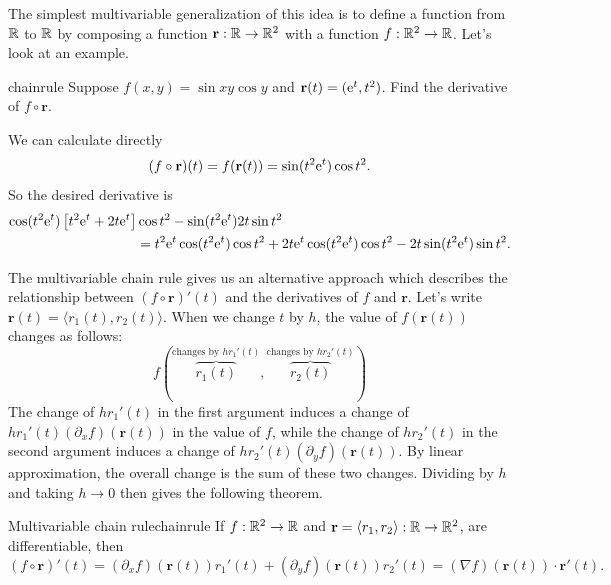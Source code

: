 \documentclass[prettycode,shellescape]{watsonbook}
\begin{document}
The simplest multivariable generalization of this idea is to define a
function from $\mathbb{R}$ to $\mathbb{R}$ by composing a function $\mathbf{r}: \mathbb{R}
\to \mathbb{R}^2$
with a function $f: \mathbb{R}^2 \to \mathbb{R}$. Let's look at an example.

\begin{example}{}{chainrule}
  Suppose $f(x,y) = \sin xy \cos y$ and $\mathbf{r}(t) = (\mathrm{e}^t,
  t^2)$. Find the derivative of $f \circ \mathbf{r}$. 
\end{example}

\begin{solution}
  We can calculate directly
  \[
    (f \circ \mathbf{r})(t) = f(\mathbf{r}(t)) = \sin (t^2\mathrm{e}^t) \cos
    t^2. 
  \]
  So the desired derivative is
  \begin{align*}
    \cos(t^2\mathrm{e}^t)\left[ t^2 \mathrm{e}^t + 2t\mathrm{e}^t\right] &\cos t^2  -
     \sin(t^2 \mathrm{e}^t) 2t \sin t^2  \\
    &=t^2 \mathrm{e}^t \cos(t^2 \mathrm{e}^t) \cos t^2 + 2t\mathrm{e}^t \cos(t^2 \mathrm{e}^t) \cos t^2 -
                           2t \sin(t^2 \mathrm{e}^t) \sin t^2. 
  \end{align*}
\end{solution}

The multivariable chain rule gives us an alternative approach which
describes the relationship between $(f\circ \mathbf{r})'(t)$ and the
derivatives of $f$ and $\mathbf{r}$. Let's write
$\mathbf{r}(t) = \langle r_1(t), r_2(t) \rangle$.  When we change
$t$ by $h$, the value of $f(\mathbf{r}(t))$ changes as follows: 
\[
  f\left(
    \overbrace{r_1(t)}^{\text{changes by $hr_1'(t)$}},
    \overbrace{r_2(t)}^{\text{changes by $hr_2'(t)$}}
  \right)
\]
The change of $hr_1'(t)$ in the first argument induces a change of
$hr_1'(t) (\partial_xf)(\mathbf{r}(t))$ in the value of $f$, while
the change of $hr_2'(t)$ in the second argument induces a change of
$hr_2'(t) (\partial_yf)(\mathbf{r}(t))$. By linear approximation,
the overall change is the sum of these two changes. Dividing by $h$
and taking $h \to 0$ then gives the following theorem.

\begin{theo}{Multivariable chain rule}{chainrule}
  If $f : \mathbb{R}^2 \to \mathbb{R}$ and $\mathbf{r} = \langle r_1,  r_2\rangle :
  \mathbb{R} \to \mathbb{R}^2$,
  are differentiable, then
  \begin{equation} \label{eq:chainrule} 
    (f\circ \mathbf{r})'(t) = (\partial_x f)(\mathbf{r}(t))r_1'(t) +
    (\partial_y f)(\mathbf{r}(t))r_2'(t) = (\nabla f)(\mathbf{r}(t))
    \cdot \mathbf{r}'(t). 
  \end{equation}
\end{theo}
\end{document}
